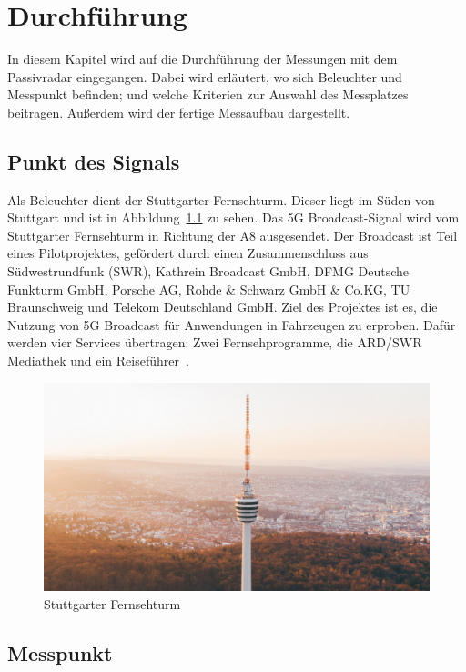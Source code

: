 \chapter{Durchführung}

In diesem Kapitel wird auf die Durchführung der Messungen mit dem Passivradar eingegangen. Dabei wird erläutert, wo sich Beleuchter und Messpunkt befinden; und welche Kriterien zur Auswahl des Messplatzes beitragen. Außerdem wird der fertige Messaufbau dargestellt.
\section{Punkt des Signals}

Als Beleuchter dient der Stuttgarter Fernsehturm. Dieser liegt im Süden von Stuttgart und ist in Abbildung~\ref{fig:Fernsehturm} zu sehen. Das 5G Broadcast-Signal wird vom Stuttgarter Fernsehturm in Richtung der A8 ausgesendet. Der Broadcast ist Teil eines Pilotprojektes, gefördert durch einen Zusammenschluss aus Südwestrundfunk (SWR), Kathrein Broadcast GmbH,  DFMG  Deutsche Funkturm GmbH, Porsche AG, Rohde \& Schwarz GmbH \& Co.\@ KG, TU Braunschweig und Telekom Deutschland GmbH\@. Ziel des Projektes ist es, die Nutzung von 5G Broadcast für Anwendungen in Fahrzeugen zu erproben. Dafür werden vier Services übertragen: Zwei Fernsehprogramme, die ARD/SWR Mediathek und ein Reiseführer~\cite{5GMAG2020}.
\begin{figure}
    \centering
    \includegraphics[width=\textwidth]{images/Fernsehturm.jpg}
    \caption{Stuttgarter Fernsehturm}\label{fig:Fernsehturm}
\end{figure}

\section{Messpunkt}

